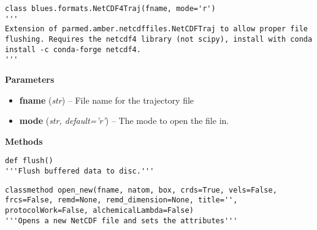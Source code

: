 \begin{description}
\begin{verbatim}
class blues.formats.NetCDF4Traj(fname, mode='r')
'''
Extension of parmed.amber.netcdffiles.NetCDFTraj to allow proper file
flushing. Requires the netcdf4 library (not scipy), install with conda
install -c conda-forge netcdf4.
'''
\end{verbatim}

\begin{description}
\item
    \textbf{Parameters}
\begin{itemize}
\item
  \textbf{fname} (\emph{str}) -- File name for the trajectory file
\item
  \textbf{mode} (\emph{str, default='r'}) -- The mode to open the file
  in.
\end{itemize}
\end{description}


\begin{description}
\item
    \textbf{Methods}
\begin{description}
\begin{verbatim}
def flush()
'''Flush buffered data to disc.'''
\end{verbatim}
\end{description}
\end{description}

\begin{description}
\begin{verbatim}
classmethod open_new(fname, natom, box, crds=True, vels=False, frcs=False, remd=None, remd_dimension=None, title='', protocolWork=False, alchemicalLambda=False)
'''Opens a new NetCDF file and sets the attributes'''
\end{verbatim}


\end{description}
\end{description}
